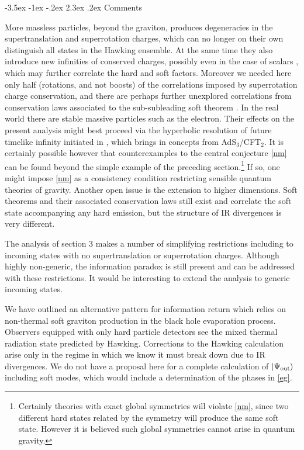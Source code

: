 \documentclass[12pt]{article}
\makeatletter
\numberwithin{equation}{section}
\def\>{\rangle }
\renewcommand\section{\@startsection {section}{1}{\z@}%
                                   {-3.5ex \@plus -1ex \@minus -.2ex}%
                                   {2.3ex \@plus.2ex}%
                                   {\normalfont\large\bfseries}}
\makeatother
\begin{document}
\section{Comments}

More massless particles, beyond the graviton,  produces degeneracies in the supertranslation and superrotation charges, which can no longer on their own distinguish all states in the Hawking ensemble. At the same time they also introduce new infinities of conserved charges, possibly even in the case of scalars \cite{Campiglia:2017dpg}, which may further correlate the hard and soft factors. Moreover we needed here only half (rotations, and not boosts) of the correlations imposed by superrotation charge conservation, and there are perhaps further unexplored correlations from conservation laws associated to the sub-subleading soft theorem \cite{Cachazo:2014fwa,Campiglia:2016jdj,Campiglia:2016efb,Conde:2016rom,Laddha:2017ygw}.
In the real world there are stable massive particles such as the electron. Their effects on the present analysis might best proceed via the hyperbolic resolution of future timelike infinity
initiated in \cite{Campiglia:2015qka}, which brings in concepts from AdS$_3$/CFT$_2$. 
It is certainly possible however that counterexamples to the central conjecture \eqref{nm} can be found beyond the simple example of the preceding section.\footnote{Certainly theories with exact global symmetries will violate \eqref{nm}, since two different hard states related by the symmetry will produce the same soft state. However it is believed such global symmetries  cannot arise  in quantum gravity.}  If so, one might impose \eqref{nm} as a consistency condition restricting sensible quantum theories of gravity. 
Another open issue is the extension to higher dimensions.  Soft theorems and their associated  conservation laws still exist and correlate the soft state accompanying any hard emission, but the structure of IR divergences is very different.

The analysis of section 3 makes a number of simplifying restrictions including to  incoming states with no  supertranslation or superrotation charges. Although highly non-generic, the information paradox is still present and can be addressed with these restrictions. It would be interesting  to extend the analysis to generic incoming states. 

We have outlined an alternative  pattern for information return 
which relies on non-thermal soft graviton production in the black hole evaporation process. Observers equipped with only hard particle detectors see the mixed thermal radiation state predicted by Hawking.  Corrections to the Hawking calculation arise only  in the regime in which we know it must break down due to IR divergences. We do not have a proposal here for a complete calculation of $|\Psi_{\rm out} \>$ including soft modes, which would  include a determination of  the phases in  \eqref{eg}. 
\end{document}
